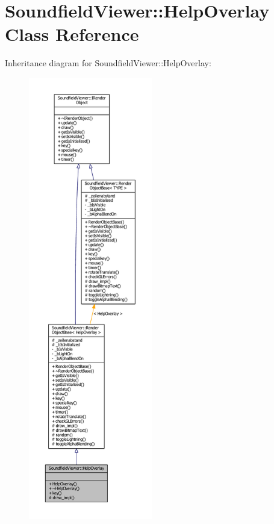 \section{Soundfield\-Viewer\-:\-:Help\-Overlay Class Reference}
\label{classSoundfieldViewer_1_1HelpOverlay}


Inheritance diagram for Soundfield\-Viewer\-:\-:Help\-Overlay\-:\nopagebreak
\begin{figure}[H]
\begin{center}
\leavevmode
\includegraphics[height=550pt]{d8/d72/classSoundfieldViewer_1_1HelpOverlay__inherit__graph}
\end{center}
\end{figure}


